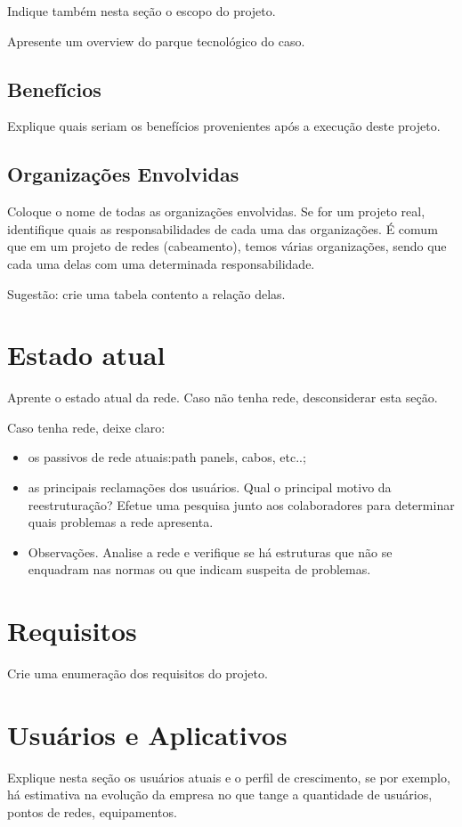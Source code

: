 \documentclass[	DIV=calc,%
							paper=a4,%
							fontsize=12pt,%
							onecolumn]{scrartcl}	 					%
\begin{document}
Indique também nesta seção o escopo do projeto.

Apresente um overview do parque tecnológico do caso.
\subsection{Benefícios}
Explique quais seriam os benefícios provenientes após a execução deste projeto.

\subsection{Organizações Envolvidas}
Coloque o nome de todas as organizações envolvidas. Se for um projeto real, identifique quais as responsabilidades de cada uma das organizações. É comum que em um projeto de redes (cabeamento), temos várias organizações, sendo que cada uma delas com uma determinada responsabilidade.

Sugestão: crie uma tabela contento a relação delas.



\section{Estado atual}
Aprente o estado atual da rede. Caso não tenha rede, desconsiderar esta seção.

Caso tenha rede, deixe claro:
\begin{itemize}
	\item os passivos de rede atuais:path panels, cabos, etc..;
	\item as principais reclamações dos usuários. Qual o principal motivo da reestruturação? Efetue uma pesquisa junto aos colaboradores para determinar quais problemas a rede apresenta.
	\item Observações. Analise a rede e verifique se há estruturas que não se enquadram nas normas ou que indicam suspeita de problemas.
\end{itemize}

\section{Requisitos}
Crie uma enumeração dos requisitos do projeto.

\section{Usuários e Aplicativos}
Explique nesta seção os usuários atuais e o perfil de crescimento, se por exemplo, há estimativa na evolução da empresa no que tange a quantidade de usuários, pontos de redes, equipamentos.
 
\end{document}

